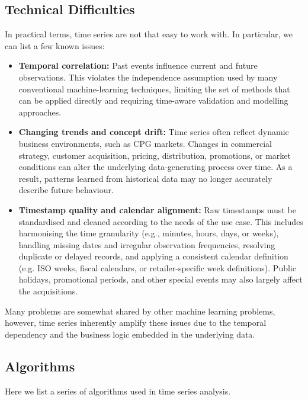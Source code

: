 \documentclass[12pt,a4paper]{article}
\begin{document}
\subsection{Technical Difficulties}
In practical terms, time series are not that easy to work with. In particular, we can list a few known issues:
\begin{itemize}
	\item \textbf{Temporal correlation:} Past events influence current and future observations. This violates the independence assumption used by many conventional machine-learning techniques, limiting the set of methods that can be applied directly and requiring time-aware validation and modelling approaches.
	
	\item \textbf{Changing trends and concept drift:} Time series often reflect dynamic business environments, such as CPG markets. Changes in commercial strategy, customer acquisition, pricing, distribution, promotions, or market conditions can alter the underlying data-generating process over time. As a result, patterns learned from historical data may no longer accurately describe future behaviour.
	
	\item \textbf{Timestamp quality and calendar alignment:} Raw timestamps must be standardised and cleaned according to the needs of the use case. This includes harmonising the time granularity (e.g., minutes, hours, days, or weeks), handling missing dates and irregular observation frequencies, resolving duplicate or delayed records, and applying a consistent calendar definition (e.g. ISO weeks, fiscal calendars, or retailer-specific week definitions). Public holidays, promotional periods, and other special events may also largely affect the acquisitions.
\end{itemize}

Many problems are somewhat shared by other machine learning problems, however, time series inherently amplify these issues due to the temporal dependency and the business logic embedded in the underlying data.


\subsection{Algorithms}
Here we list a series of algorithms used in time series analysis.
\end{document}
